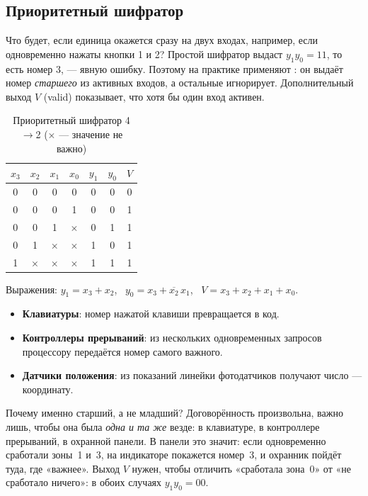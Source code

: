\subsection{Приоритетный шифратор}

Что будет, если единица окажется сразу на двух входах, например, если
одновременно нажаты кнопки 1 и 2? Простой шифратор выдаст $y_1y_0 = 11$, то есть
номер 3, --- явную ошибку. Поэтому на практике применяют
: он выдаёт номер \emph{старшего} из активных
входов, а остальные игнорирует. Дополнительный выход $V$ (valid) показывает,
что хотя бы один вход активен.

\begin{table}[H]
\centering
\caption{Приоритетный шифратор 4$\to$2 ($\times$ --- значение не важно)}
\begin{tabular}{cccc|ccc}
\toprule
$x_3$ & $x_2$ & $x_1$ & $x_0$ & $y_1$ & $y_0$ & $V$ \\
\midrule
0 & 0 & 0 & 0 & 0 & 0 & 0 \\
0 & 0 & 0 & 1 & 0 & 0 & 1 \\
0 & 0 & 1 & $\times$ & 0 & 1 & 1 \\
0 & 1 & $\times$ & $\times$ & 1 & 0 & 1 \\
1 & $\times$ & $\times$ & $\times$ & 1 & 1 & 1 \\
\bottomrule
\end{tabular}
\end{table}

Выражения: $y_1 = x_3 + x_2$, \ $y_0 = x_3 + \overline{x_2}\,x_1$, \
$V = x_3 + x_2 + x_1 + x_0$.

\begin{infobox}
\begin{itemize}
  \item \textbf{Клавиатуры}: номер нажатой клавиши превращается в код.
  \item \textbf{Контроллеры прерываний}: из нескольких одновременных запросов
        процессору передаётся номер самого важного.
  \item \textbf{Датчики положения}: из показаний линейки фотодатчиков
        получают число --- координату.
\end{itemize}
\end{infobox}

Почему именно старший, а не младший? Договорённость произвольна, важно
лишь, чтобы она была \emph{одна и та же} везде: в клавиатуре, в контроллере
прерываний, в охранной панели. В панели это значит: если одновременно
сработали зоны~1 и~3, на индикаторе покажется номер~3, и охранник
пойдёт туда, где «важнее». Выход $V$ нужен, чтобы отличить «сработала
зона~0» от «не сработало ничего»: в обоих случаях $y_1y_0=00$.

